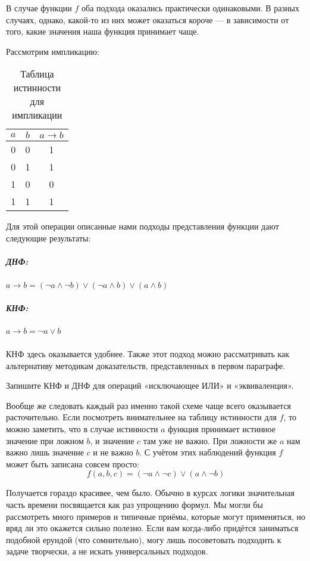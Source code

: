 В случае функции $f$ оба подхода оказались практически одинаковыми. В разных случаях, однако, какой-то из них может оказаться короче --- в зависимости от того, какие значения наша функция принимает чаще.

Рассмотрим импликацию:

\begin{table}[h]
\centering
\begin{tabular}{cc|c}
$a$&$b$&$a\rightarrow b$\\
\hline
0&0&1 \\
0&1&1 \\
1&0&0 \\
1&1&1
\end{tabular}
\caption{Таблица истинности для импликации}
\end{table}

Для этой операции описанные нами подходы представления функции дают следующие результаты:

\subparagraph{ДНФ:} $a \rightarrow b = (\neg a\land \neg b)\lor(\neg a \land b)\lor(a\land b)$

\subparagraph{КНФ:} $a\rightarrow b = \neg a \lor b$

\subparagraph{} КНФ здесь оказывается удобнее. Также этот подход можно рассматривать как альтернативу методикам доказательств, представленных в первом параграфе.

\begin{exercise} Запишите КНФ и ДНФ для операций «исключающее ИЛИ» и «эквиваленция».\end{exercise}

Вообще же следовать каждый раз именно такой схеме чаще всего оказывается расточительно. Если посмотреть вни\-ма\-тельнее на таблицу истинности для $f$, то можно заметить, что в случае истинности $a$ функция принимает истинное значение при ложном $b$, и значение $c$ там уже не важно. При ложности же $a$ нам важно лишь значение $c$ и не важно $b$. С учётом этих наблюдений функция $f$ может быть записана совсем просто: $$f(a, b, c) = (\neg a\land \neg c) \lor (a \land \neg b)$$

Получается гораздо красивее, чем было. Обычно в курсах логики значительная часть времени посвящается как раз упрощению формул. Мы могли бы рассмотреть много примеров и типичные приёмы, которые могут применяться, но вряд ли это окажется сильно полезно. Если вам когда-либо придётся заниматься подобной ерундой (что сомнительно), могу лишь посоветовать подходить к задаче творчески, а не искать универсальных подходов.

